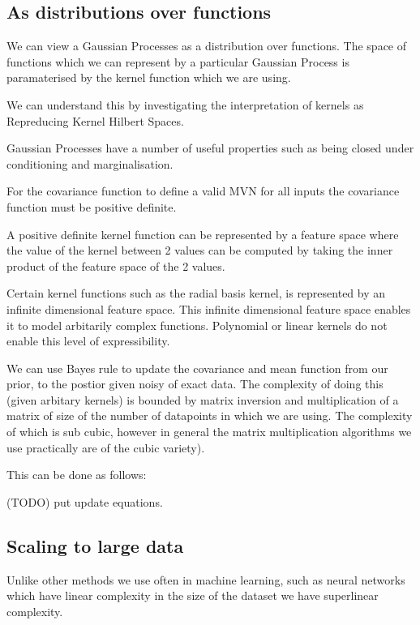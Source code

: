 \documentclass[12pt, a4paper]{report}
\theoremstyle{definition}
\begin{document}
\subsection{As distributions over functions}

We can view a Gaussian Processes as a distribution over functions. The space of functions which we can represent by a particular Gaussian Process is paramaterised by the kernel function which we are using.

We can understand this by investigating the interpretation of kernels as Repreducing Kernel Hilbert Spaces.





Gaussian Processes have a number of useful properties such as being closed under conditioning and marginalisation.

For the covariance function to define a valid MVN for all inputs the covariance function must be positive definite.

A positive definite kernel function can be represented by a feature space where the value of the kernel between 2 values can be computed by taking the inner product of the feature space of the 2 values.

Certain kernel functions such as the radial basis kernel, is represented by an infinite dimensional feature space. This infinite dimensional feature space enables it to model arbitarily complex functions. Polynomial or linear kernels do not enable this level of expressibility.

We can use Bayes rule to update the covariance and mean function from our prior, to the postior given noisy of exact data. The complexity of doing this (given arbitary kernels) is bounded by matrix inversion and  multiplication of a matrix of size of the number of datapoints in which we are using. The complexity of which is sub cubic, however in general the matrix multiplication algorithms we use practically are of the cubic variety).

This can be done as follows: 

(TODO) put update equations.

\subsection{Scaling to large data}

Unlike other methods we use often in machine learning, such as neural networks which have linear complexity in the size of the dataset we have superlinear complexity.
\end{document}
